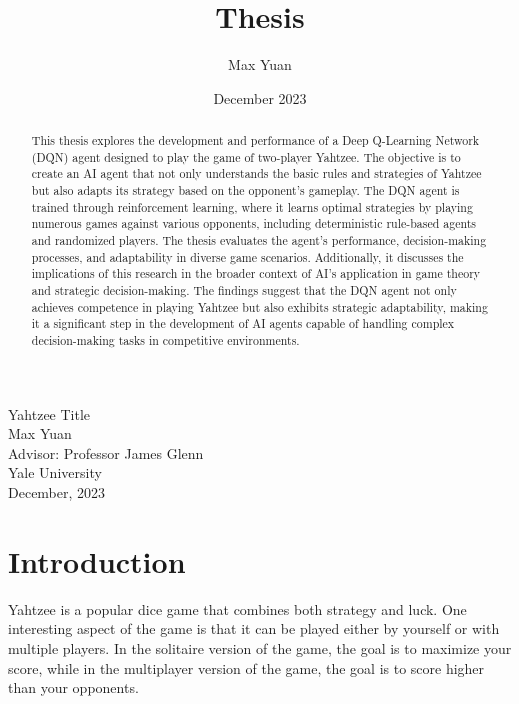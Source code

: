 \documentclass[12pt]{article}
\title{Thesis}
\author{Max Yuan}
\date{December 2023}
\begin{document}
\begin{titlepage}
    \thispagestyle{empty} %
    \centering
    \Huge
    Yahtzee Title\\
    \vspace{10mm}
    \Large
    Max Yuan\\
    Advisor: Professor James Glenn\\
    \vspace{10mm}
    Yale University\\
    December, 2023
\end{titlepage}

\newpage
\begin{abstract}
\noindent
This thesis explores the development and performance of a Deep Q-Learning Network (DQN) agent designed to play the game of two-player Yahtzee. The objective is to create an AI agent that not only understands the basic rules and strategies of Yahtzee but also adapts its strategy based on the opponent's gameplay. The DQN agent is trained through reinforcement learning, where it learns optimal strategies by playing numerous games against various opponents, including deterministic rule-based agents and randomized players. The thesis evaluates the agent's performance, decision-making processes, and adaptability in diverse game scenarios. Additionally, it discusses the implications of this research in the broader context of AI's application in game theory and strategic decision-making. The findings suggest that the DQN agent not only achieves competence in playing Yahtzee but also exhibits strategic adaptability, making it a significant step in the development of AI agents capable of handling complex decision-making tasks in competitive environments.
\end{abstract}

\tableofcontents

\newpage
\section{Introduction}
Yahtzee is a popular dice game that combines both strategy and luck. One interesting aspect of the game is that it can be played either by yourself or with multiple players. In the solitaire version of the game, the goal is to maximize your score, while in the multiplayer version of the game, the goal is to score higher than your opponents.
\end{document}
